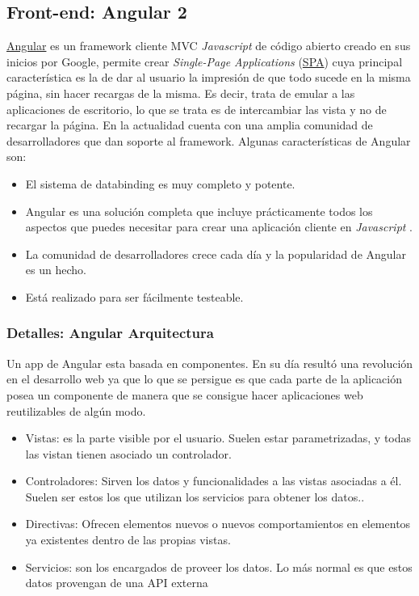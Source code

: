  \subsection{Front-end: Angular 2}\label{tecnologias-angular}
 \hyperlink{https://angular.io}{Angular} es un framework cliente MVC \emph{Javascript} de código abierto creado en sus inicios por Google, permite crear  \emph{Single-Page Applications} (\hyperlink{https://es.wikipedia.org/wiki/Single-page_application}{SPA})  cuya principal característica es la de dar al usuario la impresión de que todo sucede en la misma página, sin hacer recargas de la misma. Es decir, trata de emular a las aplicaciones de escritorio, lo que se trata es de intercambiar las vista y no de recargar la página. En la actualidad cuenta con una amplia comunidad de desarrolladores  que dan soporte al framework.  Algunas características de Angular son:
 
\begin{itemize}
\tightlist
\item
  El sistema de databinding es muy completo y potente.
\item
  Angular es una solución completa que incluye prácticamente todos los aspectos que puedes necesitar para crear una aplicación cliente en \emph{Javascript} . 
\item
  La comunidad de desarrolladores crece cada día y la popularidad de Angular es un hecho.
  \item
  Está realizado para ser fácilmente testeable.
\end{itemize}
 
\subsubsection{Detalles: Angular Arquitectura}\label{detalle-angulararquitectura}
Un app de Angular esta basada en componentes. En su día resultó una revolución en el desarrollo web ya que lo que se persigue es que cada parte de la aplicación posea un componente de manera que se consigue hacer aplicaciones web reutilizables de algún modo.

\begin{itemize}
\tightlist
\item
Vistas: es la parte visible por el usuario. Suelen estar parametrizadas, y todas
las vistan tienen asociado un controlador.
\item
 Controladores: Sirven los datos y funcionalidades a las vistas asociadas a él. Suelen ser estos los que utilizan los servicios para obtener los datos.. 
\item
 Directivas: Ofrecen elementos nuevos o nuevos comportamientos en elementos ya existentes dentro de las propias vistas.
  \item
  Servicios: son los encargados de proveer los datos. Lo más normal es que estos datos provengan de una API externa
\end{itemize}


